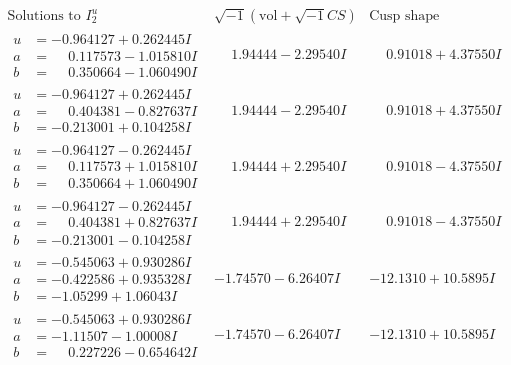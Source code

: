 \documentclass[1p]{elsarticle_modified}
\theoremstyle{definition}
\newcommand{\I}{\sqrt{-1}}
\begin{document}
$$\begin{array}{c|c|c}  
\text{Solutions to }I^u_{2}& \I (\text{vol} + \sqrt{-1}CS) & \text{Cusp shape}\\
 \hline 
\begin{aligned}
u &= -0.964127 + 0.262445 I \\
a &= \phantom{-}0.117573 - 1.015810 I \\
b &= \phantom{-}0.350664 - 1.060490 I\end{aligned}
 & \phantom{-}1.94444 - 2.29540 I & \phantom{-}0.91018 + 4.37550 I \\ \hline\begin{aligned}
u &= -0.964127 + 0.262445 I \\
a &= \phantom{-}0.404381 - 0.827637 I \\
b &= -0.213001 + 0.104258 I\end{aligned}
 & \phantom{-}1.94444 - 2.29540 I & \phantom{-}0.91018 + 4.37550 I \\ \hline\begin{aligned}
u &= -0.964127 - 0.262445 I \\
a &= \phantom{-}0.117573 + 1.015810 I \\
b &= \phantom{-}0.350664 + 1.060490 I\end{aligned}
 & \phantom{-}1.94444 + 2.29540 I & \phantom{-}0.91018 - 4.37550 I \\ \hline\begin{aligned}
u &= -0.964127 - 0.262445 I \\
a &= \phantom{-}0.404381 + 0.827637 I \\
b &= -0.213001 - 0.104258 I\end{aligned}
 & \phantom{-}1.94444 + 2.29540 I & \phantom{-}0.91018 - 4.37550 I \\ \hline\begin{aligned}
u &= -0.545063 + 0.930286 I \\
a &= -0.422586 + 0.935328 I \\
b &= -1.05299 + 1.06043 I\end{aligned}
 & -1.74570 - 6.26407 I & -12.1310 + 10.5895 I \\ \hline\begin{aligned}
u &= -0.545063 + 0.930286 I \\
a &= -1.11507 - 1.00008 I \\
b &= \phantom{-}0.227226 - 0.654642 I\end{aligned}
 & -1.74570 - 6.26407 I & -12.1310 + 10.5895 I \\ \hline\begin{aligned}

\end{aligned}
\end{array}$$
\end{document}
